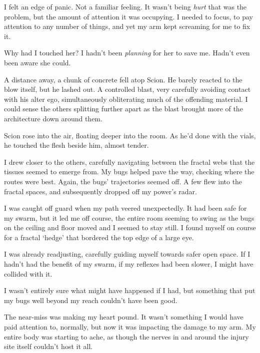 I felt an edge of panic.  Not a familiar feeling.  It wasn't being \emph{hurt }that was the problem, but the amount of attention it was occupying.  I needed to focus, to pay attention to any number of things, and yet my arm kept screaming for me to fix it.



Why had I touched her?  I hadn't been \emph{planning }for her to save me.  Hadn't even been aware she could.



A distance away, a chunk of concrete fell atop Scion.  He barely reacted to the blow itself, but he lashed out.  A controlled blast, very carefully avoiding contact with his alter ego, simultaneously obliterating much of the offending material.  I could sense the others splitting further apart as the blast brought more of the architecture down around them.



Scion rose into the air, floating deeper into the room.  As he'd done with the vials, he touched the flesh beside him, almost tender.



I drew closer to the others, carefully navigating between the fractal webs that the tissues seemed to emerge from.  My bugs helped pave the way, checking where the routes were best.  Again, the bugs' trajectories seemed off.  A few flew into the fractal spaces, and subsequently dropped off my power's radar.



I was caught off guard when my path veered unexpectedly.  It had been safe for my swarm, but it led me off course, the entire room seeming to swing as the bugs on the ceiling and floor moved and I seemed to stay still.  I found myself on course for a fractal `hedge' that bordered the top edge of a large eye.



I was already readjusting, carefully guiding myself towards safer open space.  If I hadn't had the benefit of my swarm, if my reflexes had been slower, I might have collided with it.



I wasn't entirely sure what might have happened if I had, but something that put my bugs well beyond my reach couldn't have been good.



The near-miss was making my heart pound.  It wasn't something I would have paid attention to, normally, but now it was impacting the damage to my arm.  My entire body was starting to ache, as though the nerves in and around the injury site itself couldn't host it all.



